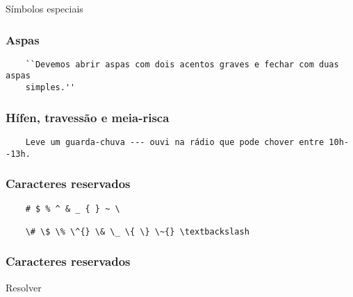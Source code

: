\begin{frame}[standout]
  \Huge
  Símbolos especiais
\end{frame}

\begin{frame}[fragile]
  \frametitle{Aspas}
  \begin{verbatim}
    ``Devemos abrir aspas com dois acentos graves e fechar com duas aspas
    simples.''
  \end{verbatim}
\end{frame}

\begin{frame}[fragile]
  \frametitle{Hífen, travessão e meia-risca}
  \begin{verbatim}
    Leve um guarda-chuva --- ouvi na rádio que pode chover entre 10h--13h.
  \end{verbatim}
\end{frame}

\begin{frame}[fragile]
  \frametitle{Caracteres reservados}
  \begin{verbatim}
    # $ % ^ & _ { } ~ \

    \# \$ \% \^{} \& \_ \{ \} \~{} \textbackslash
  \end{verbatim}
\end{frame}

\begin{frame}
  \frametitle{Caracteres reservados}
  \huge
  Resolver 
\end{frame}
